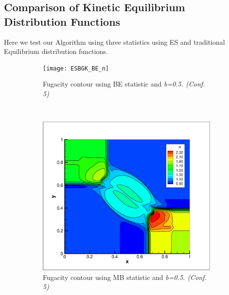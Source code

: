 \documentclass{rsproca}%
\begin{document}
\subsection{Comparison of Kinetic Equilibrium Distribution Functions}
Here we test our Algorithm using three statistics using ES and traditional Equilibrium distribution functions.

\begin{figure}
        \centering
        \begin{subfigure}[b]{0.32\textwidth}
                \centering
                \texttt{[image: ESBGK\_BE\_n]}
                \caption{Fugacity contour using BE statistic and \it{b=0.5}. (Conf. 5)}
                \label{fig:ESBGK_BE_n}
        \end{subfigure}%
        ~ %
        \begin{subfigure}[b]{0.32\textwidth}
                \centering
                \includegraphics[trim = 20mm 15mm 20mm 20mm,clip,width=\textwidth]{ESBGK_MB_n}
                \caption{Fugacity contour using MB statistic and \it{b=0.5}. (Conf. 5)}
                \label{fig:ESBGK_MB_n}
        \end{subfigure}
        ~ %
        \begin{subfigure}[b]{0.32\textwidth}

\end{subfigure}
\end{figure}
\end{document}
